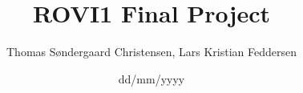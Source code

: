 \documentclass[a4paper,10pt]{article}
\title{ROVI1 Final Project}
\author{Thomas Søndergaard Christensen, Lars Kristian Feddersen}
\date{dd/mm/yyyy}
\begin{document}


\newpage
\tableofcontents
\newpage
\listoffigures
\listoftables
\listoftodos
\clearpage
\newpage

%
%
%
%
\newpage

\end{document}
